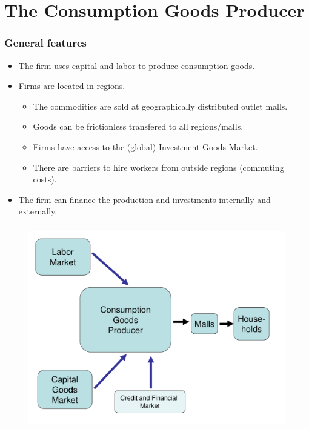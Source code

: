 \documentclass{beamer}
\begin{document}

\section{The Consumption Goods Producer}



\frame
{
  \frametitle{General features} 
\begin{itemize}
	\item The firm uses capital and labor to produce consumption goods.
	\item Firms are located in regions.
		
\begin{itemize}
	\item The commodities are sold at geographically distributed outlet malls.
	\item Goods can be frictionless transfered to all regions/malls.
	\item Firms have access to the (global) Investment Goods Market.
	\item There are barriers to hire workers from outside regions (commuting costs).
\end{itemize}

	\item The firm can finance the production and investments internally and externally.
	\end{itemize}


}


\frame
{
 \frametitle{} 
\begin{figure}
\centering
\includegraphics[scale=0.35]{CGP_Overview.pdf}
\label{fig:CGP_Overview}
\end{figure}


}
\end{document}
